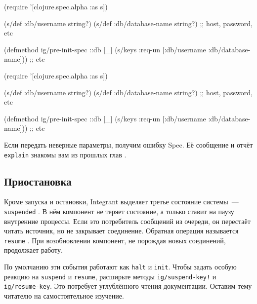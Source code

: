 \begin{english}
  \begin{clojure}
(require '[clojure.spec.alpha :as s])

(s/def :db/username string?)
(s/def :db/database-name string?)
;; host, password, etc

(defmethod ig/pre-init-spec ::db [_]
  (s/keys :req-un [:db/username
                   :db/database-name]))
                   ;; etc
  \end{clojure}
\end{english}

\else

\begin{english}
  \begin{clojure}
(require '[clojure.spec.alpha :as s])

(s/def :db/username string?)
(s/def :db/database-name string?)
;; host, password, etc

(defmethod ig/pre-init-spec ::db [_]
  (s/keys :req-un [:db/username
                   :db/database-name])) ;; etc
  \end{clojure}
\end{english}

\fi

\noindent
Если передать неверные параметры, получим ошибку Spec. Её сообщение и
отчёт \verb|explain| знакомы вам из прошлых глав .

\subsection{Приостановка}


Кроме запуска и остановки, Integrant выделяет третье состояние системы~---
\verb|suspended| . В нём компонент не теряет состояние, а
только ставит на паузу внутренние процессы. Если это потребитель сообщений из
очереди, он перестаёт читать источник, но не закрывает соединение. Обратная
операция называется \verb|resume| . При возобновлении
компонент, не порождая новых соединений, продолжает работу.

\mnoindent
По умолчанию эти события работают как \verb|halt| и \verb|init|. Чтобы
задать особую реакцию на \verb|suspend| и \verb|resume|, расширьте методы
\texttt{ig/sus\-pend\--key!} и \verb|ig/resume-key|. Это потребует углублённого
чтения документации. Оставим тему читателю на самостоятельное изучение.

